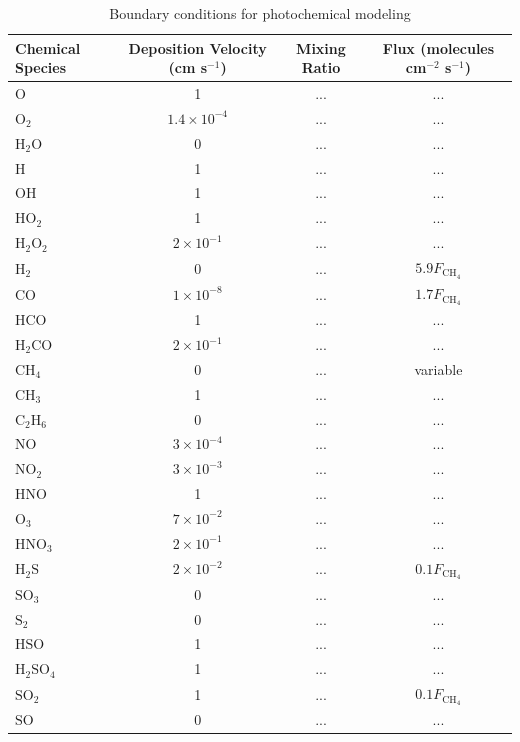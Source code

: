 \begin{table}[hbt!]
  \caption{Boundary conditions for photochemical modeling}
  \label{tab:photochem_model}
  \centering
  \begin{tabularx}{\textwidth}{l c c c}
  \hline \hline
  Chemical Species & Deposition Velocity (cm s$^{-1}$) & Mixing Ratio & Flux (molecules cm$^{-2}$ s$^{-1}$)   \\
  \hline
  $\mathrm{O}$ & 1 & ... & ... \\
  $\mathrm{O_2}$ & $1.4\times10^{-4}$ & ... & ... \\
  $\mathrm{H_2O}$ & 0 & ... & ... \\
  $\mathrm{H}$ & 1 & ... & ... \\
  $\mathrm{OH}$ & 1 & ... & ... \\
  $\mathrm{HO_2}$ & 1 & ... & ... \\
  $\mathrm{H_2O_2}$ & $2\times10^{-1}$ & ... & ... \\
  $\mathrm{H_2}$ & 0 & ... & $5.9F_\mathrm{CH_4}$ \\
  $\mathrm{CO}$ & $1\times10^{-8}$ & ... & $1.7F_\mathrm{CH_4}$ \\
  $\mathrm{HCO}$ & 1 & ... & ... \\
  $\mathrm{H_2CO}$ & $2\times10^{-1}$ & ... & ... \\
  $\mathrm{CH_4}$ & 0 & ... & variable \\
  $\mathrm{CH_3}$ & 1 & ... & ... \\
  $\mathrm{C_2H_6}$ & 0 & ... & ... \\
  $\mathrm{NO}$ & $3\times10^{-4}$ & ... & ... \\
  $\mathrm{NO_2}$ & $3\times10^{-3}$ & ... & ... \\
  $\mathrm{HNO}$ & 1 & ... & ... \\
  $\mathrm{O_3}$ & $7\times10^{-2}$ & ... & ... \\
  $\mathrm{HNO_3}$ & $2\times10^{-1}$ & ... & ... \\
  $\mathrm{H_2S}$ & $2\times10^{-2}$ & ... & $0.1F_\mathrm{CH_4}$ \\
  $\mathrm{SO_3}$ & 0 & ... & ... \\
  $\mathrm{S_2}$ & 0 & ... & ... \\
  $\mathrm{HSO}$ & 1 & ... & ... \\
  $\mathrm{H_2SO_4}$ & 1 & ... & ... \\
  $\mathrm{SO_2}$ & 1 & ... & $0.1F_\mathrm{CH_4}$ \\
  $\mathrm{SO}$ & 0 & ... & ... \\

\end{tabularx}
\end{table}
